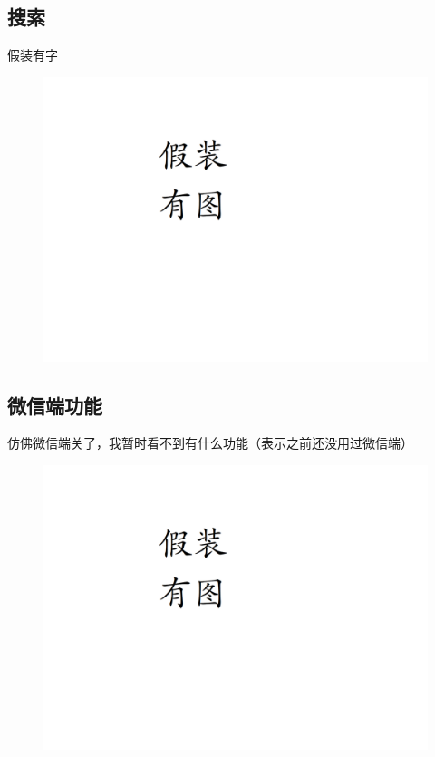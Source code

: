 \documentclass[UTF8]{ctexart}
\begin{document}
\newpage
\subsection{搜索}
假装有字
\begin{figure}[h]
    \centering
    \includegraphics[width=\textwidth]{manual_images//temp.png}
\end{figure}

\newpage
\subsection{微信端功能}
仿佛微信端关了，我暂时看不到有什么功能（表示之前还没用过微信端）
\begin{figure}[h]
    \centering
    \includegraphics[width=\textwidth]{manual_images//temp.png}
\end{figure}
\end{document}
